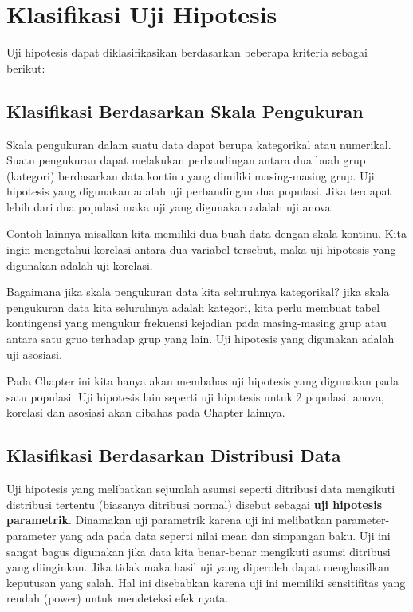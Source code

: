 \documentclass[]{book}
\begin{document}
\section{Klasifikasi Uji Hipotesis}\label{klasifikasi-uji-hipotesis}

Uji hipotesis dapat diklasifikasikan berdasarkan beberapa kriteria
sebagai berikut:

\subsection{Klasifikasi Berdasarkan Skala
Pengukuran}\label{klasifikasi-berdasarkan-skala-pengukuran}

Skala pengukuran dalam suatu data dapat berupa kategorikal atau
numerikal. Suatu pengukuran dapat melakukan perbandingan antara dua buah
grup (kategori) berdasarkan data kontinu yang dimiliki masing-masing
grup. Uji hipotesis yang digunakan adalah uji perbandingan dua populasi.
Jika terdapat lebih dari dua populasi maka uji yang digunakan adalah uji
anova.

Contoh lainnya misalkan kita memiliki dua buah data dengan skala
kontinu. Kita ingin mengetahui korelasi antara dua variabel tersebut,
maka uji hipotesis yang digunakan adalah uji korelasi.

Bagaimana jika skala pengukuran data kita seluruhnya kategorikal? jika
skala pengukuran data kita seluruhnya adalah kategori, kita perlu
membuat tabel kontingensi yang mengukur frekuensi kejadian pada
masing-masing grup atau antara satu gruo terhadap grup yang lain. Uji
hipotesis yang digunakan adalah uji asosiasi.

Pada Chapter ini kita hanya akan membahas uji hipotesis yang digunakan
pada satu populasi. Uji hipotesis lain seperti uji hipotesis untuk 2
populasi, anova, korelasi dan asosiasi akan dibahas pada Chapter
lainnya.

\subsection{Klasifikasi Berdasarkan Distribusi
Data}\label{klasifikasi-berdasarkan-distribusi-data}

Uji hipotesis yang melibatkan sejumlah asumsi seperti ditribusi data
mengikuti distribusi tertentu (biasanya ditribusi normal) disebut
sebagai \textbf{uji hipotesis parametrik}. Dinamakan uji parametrik
karena uji ini melibatkan parameter-parameter yang ada pada data seperti
nilai mean dan simpangan baku. Uji ini sangat bagus digunakan jika data
kita benar-benar mengikuti asumsi ditribusi yang diinginkan. Jika tidak
maka hasil uji yang diperoleh dapat menghasilkan keputusan yang salah.
Hal ini disebabkan karena uji ini memiliki sensitifitas yang rendah
(power) untuk mendeteksi efek nyata.
\end{document}
